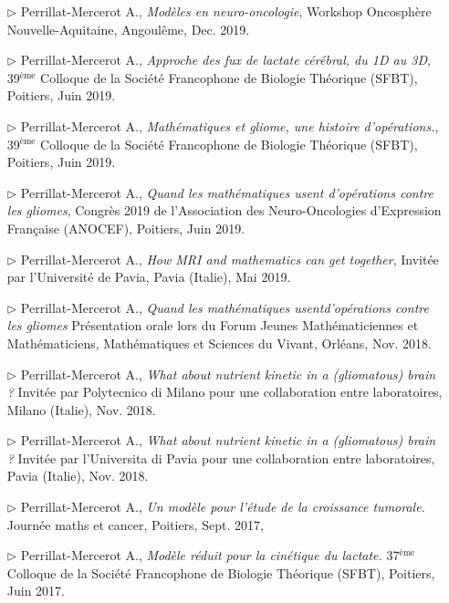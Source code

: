 \documentclass[a4paper, 12pt, twoside, openright]{article}
\begin{document}
\begin{itemize}
\begin{itemize}
\item[$\triangleright$] Perrillat-Mercerot A., \textit{Modèles en neuro-oncologie}, Workshop Oncosphère Nouvelle-Aquitaine, Angoulême, Dec. 2019.
\item[$\triangleright$] Perrillat-Mercerot A., \textit{Approche des fux de lactate cérébral, du 1D au 3D}, 39$^{\text{ème}}$ Colloque de la Société Francophone de Biologie Théorique (SFBT), Poitiers, Juin 2019.
\item[$\triangleright$] Perrillat-Mercerot A., \textit{Mathématiques et gliome, une histoire d'opérations.}, 39$^{\text{ème}}$ Colloque de la Société Francophone de Biologie Théorique (SFBT), Poitiers, Juin 2019.
\item[$\triangleright$] Perrillat-Mercerot A., \textit{Quand les mathématiques usent d'opérations contre les gliomes}, Congrès 2019 de l'Association des Neuro-Oncologies d'Expression Française (ANOCEF), Poitiers, Juin 2019.
\item[$\triangleright$] Perrillat-Mercerot A., \textit{How MRI and mathematics can get together}, Invitée par l'Université de Pavia, Pavia (Italie), Mai 2019.
\item[$\triangleright$] Perrillat-Mercerot A., \textit{Quand les mathématiques usentd'opérations contre les gliomes} Présentation orale lors du Forum Jeunes Mathématiciennes et Mathématiciens, Mathématiques et Sciences du Vivant, Orléans, Nov. 2018.
\item[$\triangleright$] Perrillat-Mercerot A., \textit{What about nutrient kinetic in a (gliomatous) brain ?} Invitée par Polytecnico di Milano pour une collaboration entre laboratoires, Milano (Italie), Nov. 2018.
\item[$\triangleright$] Perrillat-Mercerot A., \textit{What about nutrient kinetic in a (gliomatous) brain ?} Invitée par l'Universita di Pavia pour une collaboration entre laboratoires, Pavia (Italie), Nov. 2018.
\item[$\triangleright$] Perrillat-Mercerot A., \textit{Un modèle pour l'étude de la croissance tumorale.} Journée maths et cancer, Poitiers, Sept. 2017,
\item[$\triangleright$] Perrillat-Mercerot A., \textit{Modèle réduit pour la cinétique du lactate.} 37$^{\text{ème}}$ Colloque de la Société Francophone de Biologie Théorique (SFBT), Poitiers, Juin 2017. 
\end{itemize}


\end{itemize}
\end{document}
